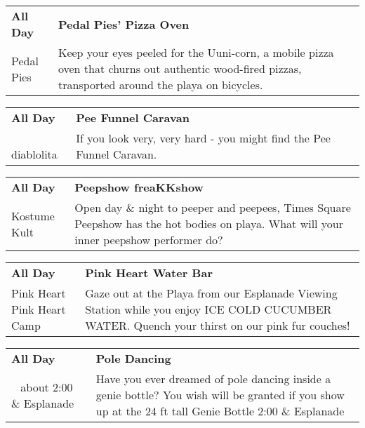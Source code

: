 \begin{tabular}{ p{1in} p{2.2in} }
    \textbf{All Day} & \textbf{Pedal Pies' Pizza Oven} \\
    Pedal Pies \newline  & Keep your eyes peeled for the Uuni-corn, a mobile pizza oven that churns out authentic wood-fired pizzas, transported around the playa on bicycles. \\
    \hline 
\end{tabular}
    
\begin{tabular}{ p{1in} p{2.2in} }
    \textbf{All Day} & \textbf{Pee Funnel Caravan} \\
    ~ \newline diablolita & If you look very, very hard - you might find the Pee Funnel Caravan. \\
    \hline 
\end{tabular}
    
\begin{tabular}{ p{1in} p{2.2in} }
    \textbf{All Day} & \textbf{Peepshow freaKKshow} \\
    Kostume Kult \newline  & Open day \& night to peeper and peepees, Times Square Peepshow has the hot bodies on playa. What will your inner peepshow performer do? \\
    \hline 
\end{tabular}
    
\begin{tabular}{ p{1in} p{2.2in} }
    \textbf{All Day} & \textbf{Pink Heart Water Bar} \\
    Pink Heart \newline Pink Heart Camp & Gaze out at the Playa from our Esplanade Viewing Station while you enjoy ICE COLD CUCUMBER WATER. Quench your thirst on our pink fur couches! \\
    \hline 
\end{tabular}
    
\begin{tabular}{ p{1in} p{2.2in} }
    \textbf{All Day} & \textbf{Pole Dancing} \\
    ~ \newline about 2:00 \& Esplanade & Have you ever dreamed of pole dancing inside a genie bottle? You wish will be granted if you show up at the 24 ft tall Genie Bottle 2:00 \& Esplanade \\
    \hline 
\end{tabular}
    
